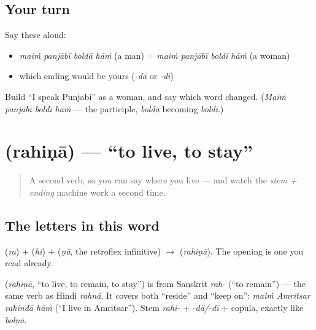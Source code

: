 \subsection*{Your turn}
Say these aloud:

\begin{itemize}
\raggedright
  \item \emph{maiṁ panjābī boldā hāṁ} (a man)  ·  \emph{maiṁ panjābī boldī hāṁ} (a woman)
  \item which ending would be yours (\emph{-dā} or \emph{-dī})
\end{itemize}

\begin{tcolorbox}[breakable,colback=teal!4,colframe=teal!35!black,title={Before you move on}]
Build \textquotedblleft{}I speak Punjabi\textquotedblright{} as a woman, and say which word changed. (\emph{Maiṁ panjābī boldī hāṁ} — the participle, \emph{boldā} becoming \emph{boldī}.)
\end{tcolorbox}
\section[\texorpdfstring{\pa{ਰਹਿਣਾ} (rahiṇā)}{ਰਹਿਣਾ (rahiṇā)}]{ (rahiṇā) — \textquotedblleft{}to live, to stay\textquotedblright{}}

\label{lesson:PA-C05-rahna}



\begin{quote}
A second verb, so you can say where you live — and watch the \emph{stem + ending} machine work a second time.
\end{quote}

\subsection*{The letters in this word}
\textbf{} (\emph{ra}) + \textbf{} (\emph{hi}) + \textbf{} (\emph{ṇā}, the retroflex infinitive) $\to$ \textbf{} (\emph{rahiṇā}). The opening \textbf{} is one you read already.

\begin{cousinweb}
\textbf{} (\emph{rahiṇā}, \textquotedblleft{}to live, to remain, to stay\textquotedblright{}) is from Sanskrit \emph{rah-} (\textquotedblleft{}to remain\textquotedblright{}) — the same verb as Hindi \emph{rahnā}. It covers both \textquotedblleft{}reside\textquotedblright{} and \textquotedblleft{}keep on\textquotedblright{}: \emph{maiṁ Amritsar rahindā hāṁ} (\textquotedblleft{}I live in Amritsar\textquotedblright{}). Stem \emph{rahi-} + \emph{-dā/-dī} + copula, exactly like \emph{bolṇā}.
\end{cousinweb}

